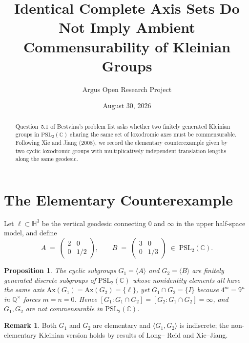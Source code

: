 \documentclass[10pt,reqno]{amsart}
\title[Identical Complete Axis Sets Do Not Imply Commensurability]
{Identical Complete Axis Sets Do Not Imply Ambient Commensurability of Kleinian Groups}
\author{Argus Open Research Project}
\date{August 30, 2026}
\newtheorem{proposition}[theorem]{Proposition}
\theoremstyle{definition}
\newtheorem{remark}[theorem]{Remark}
\begin{document}
\begin{abstract}
Question~5.1 of Bestvina's problem list asks whether two finitely generated Kleinian groups in $\mathrm{PSL}_2(\mathbb{C})$ sharing the same set of loxodromic axes must be commensurable. Following Xie and Jiang (2008), we record the elementary counterexample given by two cyclic loxodromic groups with multiplicatively independent translation lengths along the same geodesic.
\end{abstract}
\maketitle
\section{The Elementary Counterexample}
Let $\ell\subset\mathbb{H}^3$ be the vertical geodesic connecting $0$ and $\infty$ in the upper half-space model, and define
\[
  A \;=\; \begin{pmatrix} 2 & 0 \\ 0 & 1/2 \end{pmatrix},
  \qquad
  B \;=\; \begin{pmatrix} 3 & 0 \\ 0 & 1/3 \end{pmatrix} \;\in\; \mathrm{PSL}_2(\mathbb{C}).
\]
\begin{proposition}
The cyclic subgroups $G_1=\langle A\rangle$ and $G_2=\langle B\rangle$ are finitely generated discrete subgroups of $\mathrm{PSL}_2(\mathbb{C})$ whose nonidentity elements all have the same axis $\mathrm{Ax}(G_1)=\mathrm{Ax}(G_2)=\{\ell\}$, yet $G_1\cap G_2 = \{I\}$ because $4^m = 9^n$ in $\mathbb{Q}^\times$ forces $m=n=0$. Hence $[G_1:G_1\cap G_2]=[G_2:G_1\cap G_2]=\infty$, and $G_1,G_2$ are not commensurable in $\mathrm{PSL}_2(\mathbb{C})$.
\end{proposition}
\begin{remark}
Both $G_1$ and $G_2$ are elementary and $\langle G_1,G_2\rangle$ is indiscrete; the non-elementary Kleinian version holds by results of Long-- Reid and Xie--Jiang.
\end{remark}
\end{document}
